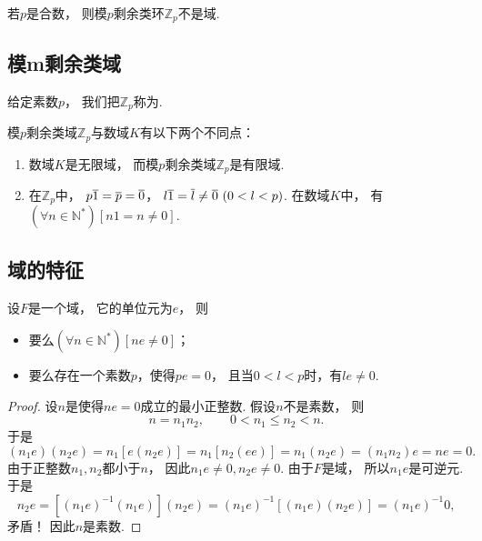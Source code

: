 \begin{theorem}
若\(p\)是合数，
则模\(p\)剩余类环\(\mathbb{Z}_p\)不是域.
\end{theorem}

\subsection{模m剩余类域}
\begin{definition}
给定素数\(p\)，
我们把\(\mathbb{Z}_p\)称为.
\end{definition}

模\(p\)剩余类域\(\mathbb{Z}_p\)与数域\(K\)有以下两个不同点：
\begin{enumerate}
	\item 数域\(K\)是无限域，
	而模\(p\)剩余类域\(\mathbb{Z}_p\)是有限域.

	\item 在\(\mathbb{Z}_p\)中，
	\(p\EquivalenceClassO{1}
	=\EquivalenceClassO{p}
	=\EquivalenceClassO{0}\)，
	\(l\EquivalenceClassO{1}
	=\EquivalenceClassO{l}
	\neq\EquivalenceClassO{0}\ (0<l<p)\).
	在数域\(K\)中，
	有\((\forall n\in\mathbb{N}^*)[n1=n\neq0]\).
\end{enumerate}

\subsection{域的特征}
\begin{theorem}
设\(F\)是一个域，
它的单位元为\(e\)，
则\begin{itemize}
	\item 要么\((\forall n\in\mathbb{N}^*)[ne\neq0]\)；
	\item 要么存在一个素数\(p\)，使得\(pe=0\)，
	且当\(0<l<p\)时，有\(le\neq0\).
\end{itemize}
\begin{proof}
设\(n\)是使得\(ne=0\)成立的最小正整数.
假设\(n\)不是素数，
则\begin{equation*}
	n=n_1 n_2,
	\qquad
	0<n_1 \leq n_2<n.
\end{equation*}
于是%
\begin{equation*}
	(n_1 e)(n_2 e)
	=n_1[e(n_2 e)]
	=n_1[n_2(ee)]
	=n_1(n_2 e)
	=(n_1 n_2)e
	=ne=0.
\end{equation*}
由于正整数\(n_1,n_2\)都小于\(n\)，
因此\(n_1 e\neq0,
n_2 e\neq0\).
由于\(F\)是域，
所以\(n_1 e\)是可逆元.
于是\begin{equation*}
	n_2 e
	=[(n_1 e)^{-1} (n_1 e)](n_2 e)
	=(n_1 e)^{-1}
	[(n_1 e)(n_2 e)]
	=(n_1 e)^{-1} 0,
\end{equation*}
矛盾！
因此\(n\)是素数.
\end{proof}
\end{theorem}

